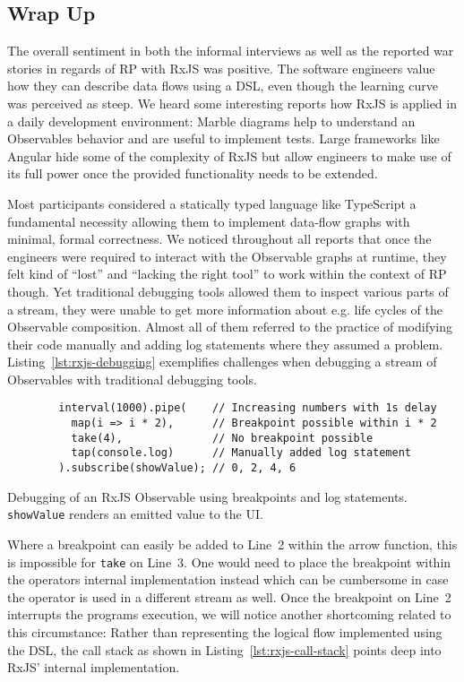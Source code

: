 \documentclass[12pt,a4paper]{article}
\begin{document}
\subsection{Wrap Up}

The overall sentiment in both the informal interviews as well as the reported war stories in regards of RP with RxJS was positive. The software engineers value how they can describe data flows using a DSL, even though the learning curve was perceived as steep. We heard some interesting reports how RxJS is applied in a daily development environment: Marble diagrams help to understand  an Observables behavior and are useful to implement tests. Large frameworks like Angular hide some of the complexity of RxJS but allow engineers to make use of its full power once the provided functionality needs to be extended.

Most participants considered a statically typed language like TypeScript a fundamental necessity allowing them to implement data-flow graphs with minimal, formal correctness. We noticed throughout all reports that once the engineers were required to interact with the Observable graphs at runtime, they felt kind of ``lost'' and ``lacking the right tool'' to work within the context of RP though. Yet traditional debugging tools allowed them to inspect various parts of a stream, they were unable to get more information about e.g. life cycles of the Observable composition. Almost all of them referred to the practice of modifying their code manually and adding log statements where they assumed a problem. Listing~\ref{lst:rxjs-debugging} exemplifies challenges when debugging a stream of Observables with traditional debugging tools.

\begin{listing}[H]
	\begin{verbatim}
		interval(1000).pipe(    // Increasing numbers with 1s delay
		  map(i => i * 2),      // Breakpoint possible within i * 2
		  take(4),              // No breakpoint possible
		  tap(console.log)      // Manually added log statement
		).subscribe(showValue); // 0, 2, 4, 6
	\end{verbatim}
	\caption{Debugging of an RxJS Observable using breakpoints and log statements. \texttt{showValue} renders an emitted value to the UI.}
	\label{lst:rxjs-debugging}
\end{listing}

Where a breakpoint can easily be added to Line~2 within the arrow function, this is impossible for \texttt{take} on Line~3. One would need to place the breakpoint within the operators internal implementation instead which can be cumbersome in case the operator is used in a different stream as well. Once the breakpoint on Line~2 interrupts the programs execution, we will notice another shortcoming related to this circumstance: Rather than representing the logical flow implemented using the DSL, the call stack as shown in Listing~\ref{lst:rxjs-call-stack} points deep into RxJS' internal implementation.
\end{document}
